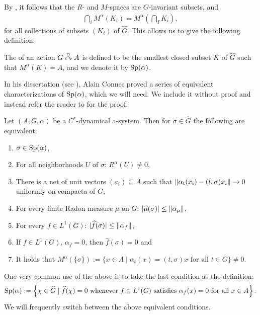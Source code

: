 By \cite[Theorem 8.1.4]{pedersenalgauto}, it follows that the $R$- and $M$-spaces are $G$-invariant subsets, and
\begin{align*}
	\bigcap_i M^\alpha(K_i) = M^\alpha(\bigcap_I K_i),
\end{align*}
for all collections of subsets $(K_i)$ of $\hat G$. This allows us to give the following definition:
\begin{definition}
	The  of an action $G \stackrel{\alpha}{\curvearrowright} A$ is defined to be the smallest closed subset $K$ of $\hat G$ such that $M^\alpha(K) = A$, and we denote it by $\mathrm{Sp}(\alpha)$.
\end{definition}
In his dissertation (see \cite{connesclassification}), Alain Connes proved a series of equivalent characterizations of $\mathrm{Sp}(\alpha)$, which we will need. We include it without proof and instead refer the reader to \cite[Proposition 8.1.9 and 8.1.8]{pedersenalgauto} for the proof.
\begin{proposition}
	Let $(A, G, \alpha)$ be a $C^*$-dynamical a-system. Then for $\sigma \in \hat G$ the following are equivalent:
	\begin{enumerate}
		\item $\sigma \in \mathrm{Sp}(\alpha)$,
		\item For all neighborhoods $U$ of $\sigma$: $R^\alpha(U) \neq 0$,
		\item There is a net of unit vectors $(a_i) \subseteq A$ such that $\left\lVert\alpha_t(x_i) - (t,\sigma)x_i\right\rVert \to 0$ uniformly on compacta of $G$,
		\item For every finite Radon measure $\mu$ on $G$: $|\widehat{\mu}(\sigma)| \leq \left\lVert \alpha_\mu\right\rVert$,
		\item For every $f \in L^1(G)$: $|\widehat{f} (\sigma)| \leq \left\lVert \alpha_f\right\rVert$,
		\item If $f \in L^1(G)$, $\alpha_f=0$, then $\hat f(\sigma)=0$ and
		\item It holds that $M^{\alpha}(\{\sigma\}) := \{x \in A \mid  \alpha_t(x) = (t,\sigma)x \text{ for all } t \in G\} \neq 0$.
	\end{enumerate}
\end{proposition}
One very common use of the above is to take the last condition as the definition:
\begin{align*}
		\mathrm{Sp}(\alpha) := \left\{ \chi \in \widehat{G} \mid \widehat{f}(\chi) = 0 \text{ whenever } f \in L^1(G) \text{ satisfies } \alpha_f(x) = 0 \text{ for all } x \in A  \right\}.
	\end{align*}
We will frequently switch between the above equivalent conditions.

